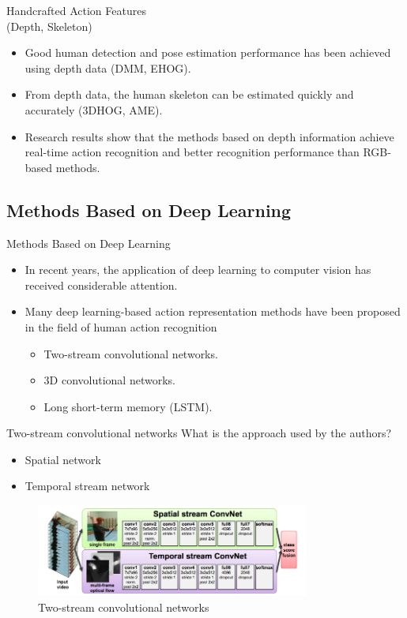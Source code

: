 \begin{frame}{Handcrafted Action Features \\ (Depth, Skeleton)}
    \begin{itemize}
        \item Good human detection and pose estimation performance has been achieved using depth data (DMM, EHOG).
        \item From depth data, the human skeleton can be estimated quickly and accurately (3DHOG, AME).
        \item Research results show that the methods based on depth information achieve real-time action recognition and better recognition performance than RGB-based methods.
    \end{itemize}
\end{frame}

\subsection{Methods Based on Deep Learning}
\begin{frame}{Methods Based on Deep Learning}
    \begin{itemize}
        \item In recent years, the application of deep learning to computer vision has received considerable attention.
        \item Many deep learning-based action representation methods have been proposed in the field of human action recognition
              \begin{itemize}
                  \item Two-stream convolutional networks.
                  \item 3D convolutional networks.
                  \item Long short-term memory (LSTM).
              \end{itemize}
    \end{itemize}
\end{frame}

\begin{frame}{Two-stream convolutional networks}
    What is the approach used by the authors?
    \begin{itemize}
        \item Spatial network
        \item Temporal stream network
    \end{itemize}
    \begin{figure}[htp]
        \centering
        \includegraphics[width=0.8\textwidth]{images/v1survey/2-stream-cnn.png}
        \caption{Two-stream convolutional networks}
    \end{figure}
\end{frame}

